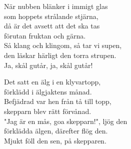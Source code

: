 \documentclass[a6paper, 10pt, twoside]{article}
\begin{document}
\begin{center}
\end{center}
\begin{lyrics}
När nubben blänker i immigt glas \\
som hoppets strålande stjärna, \\
då är det avsett att det ska tas \\
förutan fruktan och gärna. \\
Så klang och klingom, så tar vi supen, \\
den läskar härligt den torra strupen. \\
Ja, skål gutår, ja, skål gutår! 
\end{lyrics}

\begin{center}
\end{center}
\begin{lyrics}
Det satt en älg i en klyvartopp,\\
förklädd i älgjaktens månad.\\
Befjädrad var hen från tå till topp,\\
skepparn blev rätt förvånad.\\
"Jag är en mås, goa skepparn!", ljög den\\
förklädda älgen, därefter flög den.\\
Mjukt föll den sen, på skepparen.
\end{lyrics}
\end{document}
